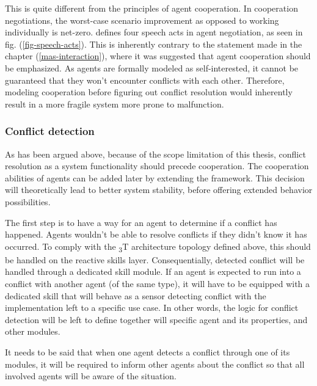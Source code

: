 \documentclass[main.tex]{subfiles}
\begin{document}
This is quite different from the principles of agent cooperation. In cooperation negotiations, 
the worst-case scenario improvement as opposed to working individually is net-zero. \cite{Binder2022}
defines four speech acts in agent negotiation, as seen in fig. (\ref{fig-speech-acts}). This is 
inherently contrary to the statement made in the chapter (\ref{mas-interaction}), where it was suggested 
that agent cooperation should be emphasized. As agents are formally modeled as self-interested, 
it cannot be guaranteed that they won't encounter conflicts with each other. Therefore, modeling 
cooperation before figuring out conflict resolution would inherently result in a more fragile system 
more prone to malfunction. 


\subsubsection{Conflict detection}

As has been argued above, because of the scope limitation of this thesis, 
conflict resolution as a system functionality should precede cooperation. The cooperation 
abilities of agents can be added later by extending the framework.
This decision will theoretically lead to better system stability, before offering extended
behavior possibilities. 

The first step is to have a way for an agent to determine if a conflict has happened. Agents wouldn't be 
able to resolve conflicts if they didn't know it has occurred. To comply with the \textsubscript{3}T
architecture topology defined above, this should be handled on the reactive skills layer. 
Consequentially, detected conflict will be handled through a dedicated skill module. If an
agent is expected to run into a conflict with another agent (of the same 
 type), it will have to be equipped with a dedicated skill that will behave as a sensor detecting conflict 
with the implementation left to a specific use case. In other words, the logic for conflict detection will be 
left to define together will specific agent and its properties, and other modules.

It needs to be said that when one agent detects a conflict through one of its modules, it will 
be required to inform other agents about the conflict so that all involved agents will be
aware of the situation. 
\end{document}

